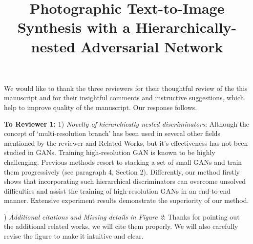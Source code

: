 \documentclass[10pt,twocolumn,letterpaper]{article}
\begin{document}
\title{Photographic Text-to-Image Synthesis with a Hierarchically-nested Adversarial Network}  %

\maketitle
\thispagestyle{empty}

\noindent
We would like to thank the three reviewers for their thoughtful review of the this manuscript and for their insightful comments and instructive suggestions, which help to improve quality of the manuscript. Our response follows.

\noindent
\textbf{To Reviewer 1:} 1) \textit{Novelty of hierarchically nested discriminators:} Although the concept of `multi-resolution branch' has been used in several other fields mentioned by the reviewer and Related Works, but it's effectiveness has not been studied in GANs.
Training high-resolution GAN is known to be highly challenging. Previous methods resort to stacking a set of small GANs and train them progressively (see paragraph 4, Section 2). Differently, our method firstly shows that incorporating such hierarchical discriminators can overcome unsolved difficulties and assist the training of high-resolution GANs in an end-to-end manner.  Extensive experiment results demonstrate the superiority of our method.



) \textit{Additional citations and Missing details in Figure 2}: Thanks for pointing out the additional related works, we will cite them properly. We will also carefully revise the figure to make it intuitive and clear.
\end{document}
